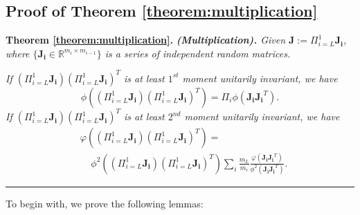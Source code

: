 \documentclass[10pt,journal,compsoc]{IEEEtran}
\begin{document}
 \subsection{Proof of Theorem \ref{theorem:multiplication}}\label{proof:multiplication}


\textbf{Theorem \ref{theorem:multiplication}. }\textit{\textbf{(Multiplication).} Given $\mathbf{J} := \Pi_{i=L}^1\mathbf{J_i}$, where $\{\mathbf{J_i}\in\mathbb{R}^{m_{i}\times m_{i-1}}\}$ is a series of independent random matrices.}

\textit{If $(\Pi_{i=L}^1\mathbf{J_i})(\Pi_{i=L}^1\mathbf{J_i})^T$ is at least $1^{st}$ moment unitarily invariant, we have}
\begin{equation}
    \phi\left((\Pi_{i=L}^1\mathbf{J_i})(\Pi_{i=L}^1\mathbf{J_i})^T\right) = \Pi_{i}\phi(\mathbf{J_iJ_i}^T).
\end{equation}
\textit{If $(\Pi_{i=L}^1\mathbf{J_i})(\Pi_{i=L}^1\mathbf{J_i})^T$ is at least $2^{nd}$ moment unitarily invariant, we have}
\begin{equation}
\begin{split}
    &\varphi((\Pi_{i=L}^1\mathbf{J_i})(\Pi_{i=L}^1\mathbf{J_i})^T)=\\
    &~~~~~\phi^2\left((\Pi_{i=L}^1\mathbf{J_i})(\Pi_{i=L}^1\mathbf{J_i})^T\right) \sum_{i}\frac{m_{L}}{m_{i}}\frac{\varphi(\mathbf{J_iJ_i}^T)}{\phi^2(\mathbf{J_iJ_i}^T)}.
\end{split}
\end{equation}
\rule[0pt]{0.49\textwidth}{0.05em}

To begin with, we prove the following lemmas:
\end{document}
